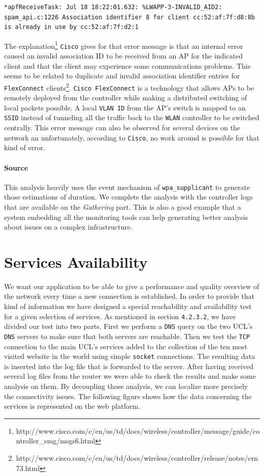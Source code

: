 \begin{lstlisting}[frame=single,breaklines=true,caption={\texttt{WiSM} association error message}]
*apfReceiveTask: Jul 18 18:22:01.632: %LWAPP-3-INVALID_AID2: spam_api.c:1226 Association identifier 8 for client cc:52:af:7f:d8:8b is already in use by cc:52:af:7f:d2:1
\end{lstlisting}

The explanation\footnote{http://www.cisco.com/c/en/us/td/docs/wireless/controller/message/guide/controller\_smg/msgs6.html} \texttt{Cisco} gives for that error message is that an internal error caused an invalid association ID to be received from an AP for the indicated client and that the client may experience some communications problems. This seems to be related to duplicate and invalid association identifier entries for \texttt{FlexConnect} clients\footnote{http://www.cisco.com/c/en/us/td/docs/wireless/controller/release/notes/crn73.html}. \texttt{Cisco FlexConnect} is a technology that allows APs to be remotely deployed from the controller while making a distributed switching of local packets possible. A local \texttt{VLAN ID} from the AP's switch is mapped to an \texttt{SSID} instead of tunneling all the traffic back to the \texttt{WLAN} controller to be switched centrally. This error message can also be observed for several devices on the network an unfortunately, according to \texttt{Cisco}, no work around is possible for that kind of error.


\paragraph*{Source} This analysis heavily uses the event mechanism of \texttt{wpa\_supplicant} to generate those estimations of duration. We complete the analysis with the controller logs that are available on the \emph{Gathering} part. This is also a good example that a system embedding all the monitoring tools can help generating better analysis about issues on a complex infrastructure.


\section{Services Availability}
We want our application to be able to give a performance and quality overview of the network every time a new connection is established. In order to provide that kind of information we have designed a special reachability and availability test for a given selection of services. As mentioned in section \texttt{4.2.3.2}, we have divided our test into two parts. First we perform a \texttt{DNS} query on the two UCL's \texttt{DNS} servers to make sure that both servers are reachable. Then we test the \texttt{TCP} connection to the main UCL's services added to the collection of the ten most visited website in the world using simple \texttt{socket} connections. The resulting data is inserted into the log file that is forwarded to the server. After having received several log files from the router we were able to check the results and make some analysis on them. By decoupling those analysis, we can localize more precisely the connectivity issues. The following figure shows how the data concerning the services is represented on the web platform.

